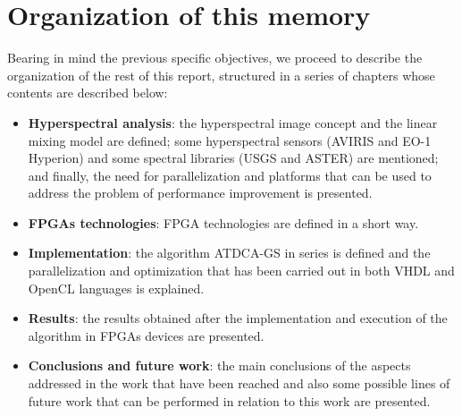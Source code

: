 \section{Organization of this memory}

Bearing in mind the previous specific objectives, we proceed to describe the organization of the rest of this report, structured in a series of chapters whose contents are described below:

\begin{itemize}
    \item \textbf{Hyperspectral analysis}: the hyperspectral image concept and the linear mixing model are defined; some hyperspectral sensors (AVIRIS and EO-1 Hyperion) and some spectral libraries (USGS and ASTER) are mentioned; and finally, the need for parallelization and platforms that can be used to address the problem of performance improvement is presented.
    \item \textbf{FPGAs technologies}: FPGA technologies are defined in a short way.
    \item \textbf{Implementation}: the algorithm ATDCA-GS in series is defined and the parallelization and optimization that has been carried out in both VHDL and OpenCL languages is explained.
    \item \textbf{Results}: the results obtained after the implementation and execution of the algorithm in FPGAs devices are presented.
    \item \textbf{Conclusions and future work}: the main conclusions of the aspects addressed in the work that have been reached and also some possible lines of future work that can be performed in relation to this work are presented.
\end{itemize}